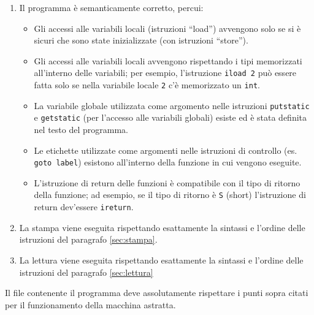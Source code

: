 \begin{enumerate}
  \item Il programma \`e semanticamente corretto, percui:
  \begin{itemize}
    \item Gli accessi alle variabili locali (istruzioni ``load'') avvengono solo se si \`e sicuri che sono state inizializzate (con istruzioni ``store'').
    \item Gli accessi alle variabili locali avvengono rispettando i tipi memorizzati all'interno delle variabili; per esempio, l'istruzione \texttt{iload~2} pu\`o essere fatta solo se nella variabile locale \texttt{2} c'\`e memorizzato un \texttt{int}.
    \item La variabile globale utilizzata come argomento nelle istruzioni \texttt{putstatic} e \texttt{getstatic} (per l'accesso alle variabili globali) esiste ed \`e stata definita nel testo del programma.
    \item Le etichette utilizzate come argomenti nelle istruzioni di controllo (es. \texttt{goto label}) esistono all'interno della funzione in cui vengono eseguite.
    \item L'istruzione di return delle funzioni \`e compatibile con il tipo di ritorno della funzione; ad esempio, se il tipo di ritorno \`e \texttt{S} (short) l'istruzione di return dev'essere \texttt{ireturn}.
  \end{itemize}
  \item La stampa viene eseguita rispettando esattamente la sintassi e l'ordine delle istruzioni del paragrafo \ref{sec:stampa}.
  \item La lettura viene eseguita rispettando esattamente la sintassi e l'ordine delle istruzioni del paragrafo \ref{sec:lettura}

\end{enumerate}
Il file contenente il programma deve assolutamente rispettare i punti sopra citati per il funzionamento della macchina astratta.
